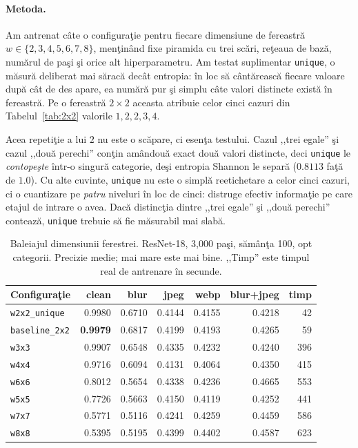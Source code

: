 \paragraph{Metoda.} Am antrenat câte o configuraţie pentru fiecare dimensiune de
fereastră $w \in \{2,3,4,5,6,7,8\}$, menţinând fixe piramida cu trei scări,
reţeaua de bază, numărul de paşi şi orice alt hiperparametru. Am testat
suplimentar \texttt{unique}, o măsură deliberat mai săracă decât entropia:
în loc să cântărească fiecare valoare după cât de des apare, ea numără pur şi
simplu câte valori distincte există în fereastră. Pe o fereastră $2\times2$
aceasta atribuie celor cinci cazuri din Tabelul~\ref{tab:2x2} valorile
$1, 2, 2, 3, 4$.

Acea repetiţie a lui $2$ nu este o scăpare, ci esenţa testului. Cazul ,,trei
egale'' şi cazul ,,două perechi'' conţin amândouă exact două valori distincte,
deci \texttt{unique} le \emph{contopeşte} într-o singură categorie, deşi
entropia Shannon le separă ($0.8113$ faţă de $1.0$). Cu alte cuvinte,
\texttt{unique} nu este o simplă reetichetare a celor cinci cazuri, ci o
cuantizare pe \emph{patru} niveluri în loc de cinci: distruge efectiv informaţie
pe care etajul de intrare o avea. Dacă distincţia dintre ,,trei egale'' şi
,,două perechi'' contează, \texttt{unique} trebuie să fie măsurabil mai slabă.

\begin{table}[t]
  \centering
  \caption{Baleiajul dimensiunii ferestrei. ResNet-18, 3{,}000 paşi, sămânţa 100,
  opt categorii. Precizie medie; mai mare este mai bine. ,,Timp'' este timpul
  real de antrenare în secunde.}
  \label{tab:window}
  \begin{tabular}{lrrrrrr}
    \toprule
    Configuraţie & clean & blur & jpeg & webp & blur+jpeg & timp \\
    \midrule
    \texttt{w2x2\_unique}  & 0.9980 & 0.6710 & 0.4144 & 0.4155 & 0.4218 & 42 \\
    \texttt{baseline\_2x2} & \textbf{0.9979} & 0.6817 & 0.4199 & 0.4193 & 0.4265 & 59 \\
    \texttt{w3x3}          & 0.9907 & 0.6548 & 0.4335 & 0.4232 & 0.4240 & 396 \\
    \texttt{w4x4}          & 0.9716 & 0.6094 & 0.4131 & 0.4064 & 0.4350 & 415 \\
    \texttt{w6x6}          & 0.8012 & 0.5654 & 0.4338 & 0.4236 & 0.4665 & 553 \\
    \texttt{w5x5}          & 0.7726 & 0.5663 & 0.4150 & 0.4119 & 0.4252 & 441 \\
    \texttt{w7x7}          & 0.5771 & 0.5116 & 0.4241 & 0.4259 & 0.4459 & 586 \\
    \texttt{w8x8}          & 0.5395 & 0.5195 & 0.4399 & 0.4402 & 0.4587 & 623 \\
    \bottomrule
  \end{tabular}
\end{table}

